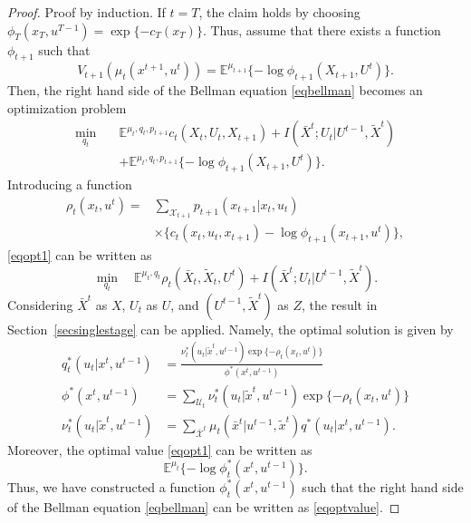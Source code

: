 \begin{proof}
Proof by induction. If $t=T$, the claim holds by choosing $\phi_T(x_T, u^{T-1})=\exp\{-c_T(x_T)\}$.
Thus, assume that there exists a function $\phi_{t+1}$ such that
\[
V_{t+1}(\mu_t(x^{t+1}, u^{t}))=\mathbb{E}^{\mu_{t+1}}\{-\log \phi_{t+1}(X_{t+1}, U^{t})\}.
\]
Then, the right hand side of the Bellman equation \eqref{eqbellman} becomes an optimization problem
\begin{align}
\min_{q_t}\quad &\mathbb{E}^{\mu_t, q_t, p_{t+1}}c_t(X_t, U_t, X_{t+1}) + I(\bar{X}^t; U_t|U^{t-1}, \tilde{X}^t) \nonumber \\
&+\mathbb{E}^{\mu_t, q_t, p_{t+1}}\{-\log \phi_{t+1}(X_{t+1}, U^t)\}. \label{eqopt1}
\end{align}
Introducing a function 
\begin{align*}
\rho_t(x_t, u^t)=&\sum_{\mathcal{X}_{t+1}} p_{t+1}(x_{t+1}|x_t, u_t) \\
&\times \{c_t(x_t, u_t, x_{t+1})-\log \phi_{t+1}(x_{t+1},u^t)\},
\end{align*}
\eqref{eqopt1} can be written as
\[
\min_{q_t} \quad \mathbb{E}^{\mu_t, q_t} \rho_t(\bar{X}_t, \tilde{X}_t, U^t)+I(\bar{X}^t; U_t|U^{t-1}, \tilde{X}^t).
\]
Considering $\bar{X}^t$ as $X$, $U_t$ as $U$, and $(U^{t-1}, \tilde{X}^t)$ as $Z$, the result in Section~\ref{secsinglestage} can be applied. Namely, the optimal solution is given by
\begin{align*}
q_t^*(u_t|x^t, u^{t-1})&=\frac{\nu_t^*(u_t|\tilde{x}^t, u^{t-1})\exp\{-\rho_t(x_t, u^t)\}}{\phi^*(x^t, u^{t-1})} \\
\phi^*(x^t, u^{t-1})&=\sum_{\mathcal{U}_t} \nu_t^*(u_t|\tilde{x}^t, u^{t-1})\exp\{-\rho_t(x_t, u^t)\} \\
\nu_t^*(u_t|\tilde{x}^t, u^{t-1})&=\sum_{\bar{\mathcal{X}}^t} \mu_t(\bar{x}^t|u^{t-1}, \tilde{x}^t)q^*(u_t|x^t, u^{t-1}).
\end{align*}
Moreover, the optimal value \eqref{eqopt1} can be written as
\begin{equation}
\label{eqoptvalue}
\mathbb{E}^{\mu_t} \{-\log\phi_t^*(x^t, u^{t-1})\}.
\end{equation}
Thus, we have constructed a function $\phi_t^*(x^t, u^{t-1})$ such that the right hand side of the Bellman equation  \eqref{eqbellman} can be written as \eqref{eqoptvalue}.
\end{proof}
